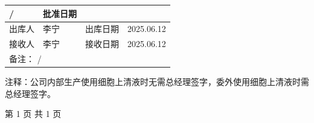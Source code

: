 \documentclass[UTF8,10pt,a4paper,fontset=fandol]{ctexart}
\newcommand{\fieldvalue}[1]{#1}
\newcommand{\handwritten}[1]{#1}
\begin{document}
\begin{tabularx}{\textwidth}{|p{3.2cm}|X|p{3.2cm}|X|}
\fieldvalue{\handwritten{/}}
&
批准日期 & \\
\hline
出库人 &
\fieldvalue{\handwritten{李宁}}
&
出库日期 &
\fieldvalue{\handwritten{2025.06.12}}\\
\hline
接收人 &
\fieldvalue{\handwritten{李宁}}
&
接收日期 &
\fieldvalue{\handwritten{2025.06.12}}\\
\hline
\multicolumn{4}{|l|}{备注：
\fieldvalue{\handwritten{/}}}\\
\hline
\end{tabularx}

\noindent
注释：公司内部生产使用细胞上清液时无需总经理签字，委外使用细胞上清液时需总经理签字。

\begin{center}
第 1 页 共 1 页
\end{center}

\newpage

\end{document}
